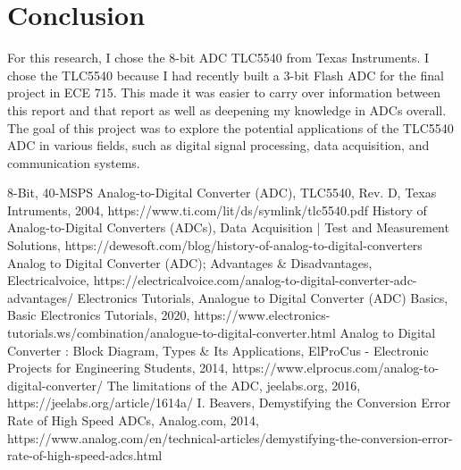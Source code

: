 \documentclass[conference]{IEEEtran}
\begin{document}
\section{Conclusion}

For this research, I chose the 8-bit ADC TLC5540 from Texas Instruments.
I chose the TLC5540 because I had recently built a 3-bit Flash ADC for the final project in ECE 715. This made it was easier to carry over information between this report and that report as well as deepening my knowledge in ADCs overall.
The goal of this project was to explore the potential applications of the TLC5540 ADC in various fields, such as digital signal processing, data acquisition, and communication systems.

\begin{thebibliography}{00}
 8-Bit, 40-MSPS Analog-to-Digital Converter (ADC), TLC5540, Rev. D, Texas Intruments, 2004, https://www.ti.com/lit/ds/symlink/tlc5540.pdf
 History of Analog-to-Digital Converters (ADCs), Data Acquisition | Test and Measurement Solutions, https://dewesoft.com/blog/history-of-analog-to-digital-converters
 Analog to Digital Converter (ADC); Advantages \& Disadvantages, Electricalvoice, https://electricalvoice.com/analog-to-digital-converter-adc-advantages/
 Electronics Tutorials, Analogue to Digital Converter (ADC) Basics, Basic Electronics Tutorials, 2020, https://www.electronics-tutorials.ws/combination/analogue-to-digital-converter.html
 Analog to Digital Converter : Block Diagram, Types \& Its Applications, ElProCus - Electronic Projects for Engineering Students, 2014, https://www.elprocus.com/analog-to-digital-converter/
 The limitations of the ADC, jeelabs.org, 2016, https://jeelabs.org/article/1614a/
 I. Beavers, Demystifying the Conversion Error Rate of High Speed ADCs, Analog.com, 2014, https://www.analog.com/en/technical-articles/demystifying-the-conversion-error-rate-of-high-speed-adcs.html
\end{thebibliography}
\end{document}
